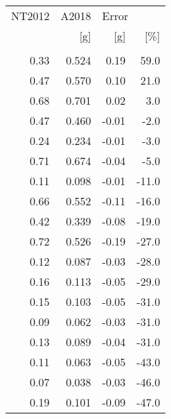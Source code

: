 \begin{tabular}{rrrr}
\toprule
NT2012 &  A2018 & \multicolumn{2}{l}{Error} \\
   [g] &    [g] &   [g] &   [\%] \\
       &        &       &       \\
\midrule
  0.33 &  0.524 &  0.19 &  59.0 \\
  0.47 &  0.570 &  0.10 &  21.0 \\
  0.68 &  0.701 &  0.02 &   3.0 \\
  0.47 &  0.460 & -0.01 &  -2.0 \\
  0.24 &  0.234 & -0.01 &  -3.0 \\
  0.71 &  0.674 & -0.04 &  -5.0 \\
  0.11 &  0.098 & -0.01 & -11.0 \\
  0.66 &  0.552 & -0.11 & -16.0 \\
  0.42 &  0.339 & -0.08 & -19.0 \\
  0.72 &  0.526 & -0.19 & -27.0 \\
  0.12 &  0.087 & -0.03 & -28.0 \\
  0.16 &  0.113 & -0.05 & -29.0 \\
  0.15 &  0.103 & -0.05 & -31.0 \\
  0.09 &  0.062 & -0.03 & -31.0 \\
  0.13 &  0.089 & -0.04 & -31.0 \\
  0.11 &  0.063 & -0.05 & -43.0 \\
  0.07 &  0.038 & -0.03 & -46.0 \\
  0.19 &  0.101 & -0.09 & -47.0 \\
\bottomrule
\end{tabular}
